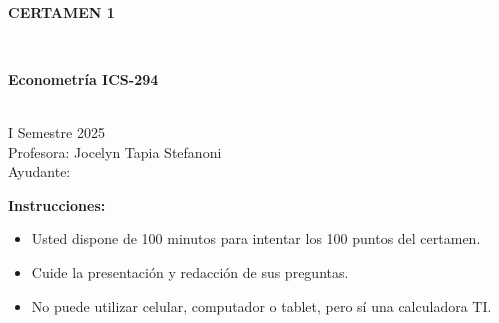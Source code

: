 \documentclass[10pt,a4paper]{article}
\begin{document}
\vspace{5cm}



\begin{center}
\begin{large}
\textbf{\\CERTAMEN 1}
\end{large}\\
\end{center}

\begin{center}
\begin{large}
\textbf{Econometría ICS-294}
\end{large}\\
\vspace{0.2cm}
I Semestre 2025\\
Profesora: Jocelyn Tapia Stefanoni\\
Ayudante: 
\end{center}

\textbf{Instrucciones:} 

\begin{itemize}

    \item Usted dispone de 100 minutos  para intentar los 100 puntos del certamen.
    \item Cuide la presentación y redacción de sus preguntas.
    \item No puede utilizar celular, computador o tablet, pero sí una calculadora TI.
     
\end{itemize}
\end{document}
